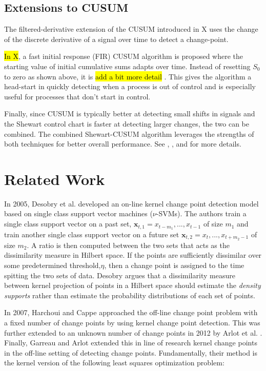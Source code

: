 \subsection{Extensions to CUSUM}
The filtered-derivative extension of the CUSUM introduced in X uses the change of the discrete derivative of a signal over time to detect a change-point. 

\hl{In X}, a fast initial response (FIR) CUSUM algorithm is proposed where the starting value of initial cumulative sums adapts over time. Instead of resetting $S_0$ to zero as shown above, it is \hl{add a bit more detail} . This gives the algorithm a head-start in quickly detecting when a process is out of control and is especially useful for processes that don't start in control.

Finally, since CUSUM is typically better at detecting small shifts in signals and the Shewart control chart is faster at detecting larger changes, the two can be combined. The combined Shewart-CUSUM algorithm leverages the strengths of both techniques for better overall performance. See \cite{lucas1982combined}, \cite{yashchin1985analysis}, and \cite{westgard1977combined} for more details. 

\section{Related Work}

In 2005, Desobry et al. \cite{desobry2005online} developed an on-line kernel change point detection model based on single class support vector machines ($\nu$-SVMs). The authors train a single class support vector on a past set, $\mathbf{x}_{t,1}={x_{t-m_1},...,x_{t-1}}$ of size $m_1$ and train another single class support vector on a future set $\mathbf{x}_{t,2}={x_t,...,x_{t+m_2-1}}$ of size $m_2$. A ratio is then computed between the two sets that acts as the dissimilarity measure in Hilbert space. If the points are sufficiently dissimilar over some predetermined threshold,$\eta$, then a change point is assigned to the time spitting the two sets of data. Desobry argues that a dissimilarity measure between kernel projection of points in a Hilbert space should estimate the \textit{density supports} rather than estimate the probability distributions of each set of points. 

In 2007, Harchoui and Cappe \cite{harchaoui2007retrospective} approached the off-line change point problem with a fixed number of change points by using kernel change point detection. This was further extended to an unknown number of change points in 2012 by Arlot et al. \cite{arlot2012kernel}. Finally, Garreau and Arlot extended this in line of research kernel change points in the off-line setting of detecting change points. Fundamentally, their method is the kernel version of the following least squares optimization problem:

